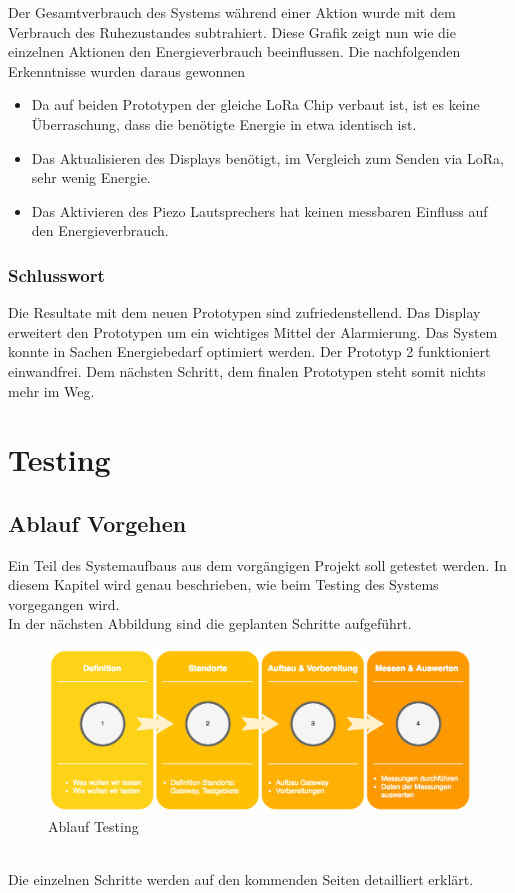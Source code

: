 \documentclass[11pt,english,german]{report}
\theoremstyle{definition}
\begin{document}
\noindent
Der Gesamtverbrauch des Systems während einer Aktion wurde mit dem Verbrauch des Ruhezustandes subtrahiert. Diese Grafik zeigt nun wie die einzelnen Aktionen den Energieverbrauch beeinflussen. Die nachfolgenden Erkenntnisse wurden daraus gewonnen
\begin{itemize}
\item Da auf beiden Prototypen der gleiche LoRa Chip verbaut ist, ist es keine Überraschung, dass die benötigte Energie in etwa identisch ist. 
\item Das Aktualisieren des Displays benötigt, im Vergleich zum Senden via LoRa,  sehr wenig Energie.
\item Das Aktivieren des Piezo Lautsprechers hat keinen messbaren Einfluss auf den Energieverbrauch.
\end{itemize}

\newpage
\subsection{Schlusswort}
Die Resultate mit dem neuen Prototypen sind zufriedenstellend. Das Display erweitert den Prototypen um ein wichtiges Mittel der Alarmierung. Das System konnte in Sachen Energiebedarf optimiert werden. Der Prototyp 2 funktioniert einwandfrei. Dem nächsten Schritt, dem finalen Prototypen steht somit nichts mehr im Weg.


\chapter{Testing}
\section{Ablauf Vorgehen}
Ein Teil des Systemaufbaus aus dem vorgängigen Projekt soll getestet werden. In diesem Kapitel wird genau beschrieben, wie beim Testing des Systems vorgegangen wird.\\[0.3cm]
In der nächsten Abbildung sind die geplanten Schritte aufgeführt.
\begin{figure}[h]
	\centering
	\includegraphics[width=\textwidth]{img/projectFlow_testing.png}
	\caption[Flowchart Testing]
	{Ablauf Testing}
\end{figure}
\\ 
Die einzelnen Schritte werden auf den kommenden Seiten detailliert erklärt.
\newpage
\end{document}
